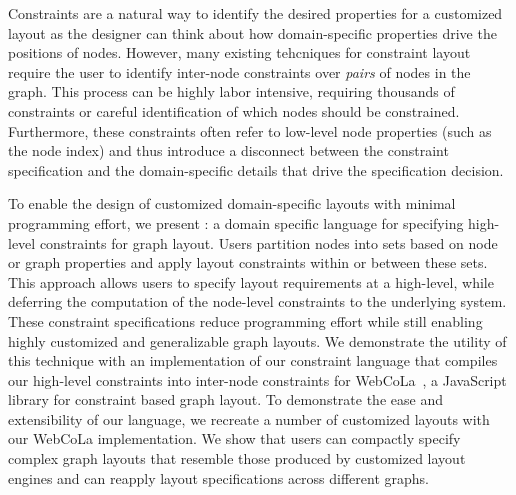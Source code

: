 Constraints are a natural way to identify the desired properties for a customized layout as the designer can think about how domain-specific properties drive the positions of nodes. However, many existing tehcniques for constraint layout require the user to identify inter-node constraints over \emph{pairs} of nodes in the graph. This process can be highly labor intensive, requiring thousands of constraints or careful identification of which nodes should be constrained. Furthermore, these constraints often refer to low-level node properties (such as the node index) and thus introduce a disconnect between the constraint specification and the domain-specific details that drive the specification decision.

To enable the design of customized domain-specific layouts with minimal programming effort, we present \projectname: a domain specific language for specifying high-level constraints for graph layout. Users partition nodes into sets based on node or graph properties and apply layout constraints within or between these sets. This approach allows users to specify layout requirements at a high-level, while deferring the computation of the node-level constraints to the underlying system. These constraint specifications reduce programming effort while still enabling highly customized and generalizable graph layouts. We demonstrate the utility of this technique with an implementation of our constraint language that compiles our high-level constraints into inter-node constraints for WebCoLa~\cite{WebCoLa}, a JavaScript library for constraint based graph layout. To demonstrate the ease and extensibility of our language, we recreate a number of customized layouts with our WebCoLa implementation. We show that users can compactly specify complex graph layouts that resemble those produced by customized layout engines and can reapply layout specifications across different graphs.